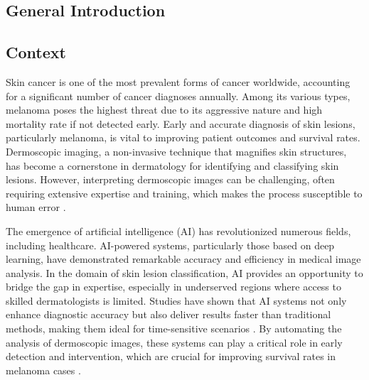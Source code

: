 \documentclass[a4paper,12pt]{report}
\begin{document}
\begin{spacing}{1.5}
\newpage

\chapter{General Introduction}
    \section{Context}
    Skin cancer is one of the most prevalent forms of cancer worldwide, accounting for a significant number of cancer diagnoses annually. Among its various types, melanoma poses the highest threat due to its aggressive nature and high mortality rate if not detected early. Early and accurate diagnosis of skin lesions, particularly melanoma, is vital to improving patient outcomes and survival rates. Dermoscopic imaging, a non-invasive technique that magnifies skin structures, has become a cornerstone in dermatology for identifying and classifying skin lesions. However, interpreting dermoscopic images can be challenging, often requiring extensive expertise and training, which makes the process susceptible to human error \cite{intro1}.

    The emergence of artificial intelligence (AI) has revolutionized numerous fields, including healthcare. AI-powered systems, particularly those based on deep learning, have demonstrated remarkable accuracy and efficiency in medical image analysis. In the domain of skin lesion classification, AI provides an opportunity to bridge the gap in expertise, especially in underserved regions where access to skilled dermatologists is limited. Studies have shown that AI systems not only enhance diagnostic accuracy but also deliver results faster than traditional methods, making them ideal for time-sensitive scenarios \cite{intro2}. By automating the analysis of dermoscopic images, these systems can play a critical role in early detection and intervention, which are crucial for improving survival rates in melanoma cases \cite{intro3}.
    
    \newpage


\end{spacing}
\end{document}
